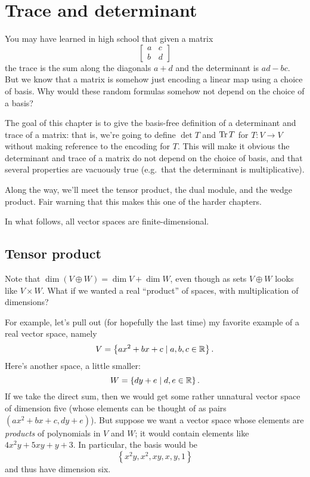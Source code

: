 \chapter{Trace and determinant}
You may have learned in high school that given a matrix
\[ 
	\begin{bmatrix}
		a & c \\
		b & d
	\end{bmatrix}
\]
the trace is the sum along the diagonals $a+d$ and the determinant is $ad-bc$.
But we know that a matrix is somehow just encoding a linear map using a choice of basis.
Why would these random formulas somehow not depend on the choice of a basis?

The goal of this chapter is to give the basis-free definition of a determinant and trace of a matrix:
that is, we're going to define $\det T$ and $\operatorname{Tr} T$ for $T : V \to V$ without making reference to the encoding for $T$.
This will make it obvious the determinant and trace of a matrix do not depend on the choice of basis,
and that several properties are vacuously true (e.g.\ that the determinant is multiplicative).

Along the way, we'll meet the tensor product, the dual module, and the wedge product.
Fair warning that this makes this one of the harder chapters.

In what follows, all vector spaces are finite-dimensional.

\section{Tensor product}
Note that $\dim (V \oplus W) = \dim V + \dim W$, even though as sets $V \oplus W$ looks like $V \times W$.
What if we wanted a real ``product'' of spaces,
with multiplication of dimensions?

For example, let's pull out (for hopefully the last time)
my favorite example of a real vector space, namely
\[ V = \left\{ ax^2 + bx + c \mid a,b,c \in \mathbb R \right\}. \]
Here's another space, a little smaller:
\[ W = \left\{ dy + e \mid d,e \in \mathbb R \right\}. \]
If we take the direct sum, then we would get some rather unnatural
vector space of dimension five
(whose elements can be thought of as pairs $(ax^2+bx+c,dy+e)$).
But suppose we want a vector space
whose elements are \emph{products} of polynomials in $V$ and $W$;
it would contain elements like $4x^2y + 5xy + y + 3$.
In particular, the basis would be
\[ \left\{ x^2y, x^2, xy, x, y, 1 \right\} \]
and thus have dimension six.

